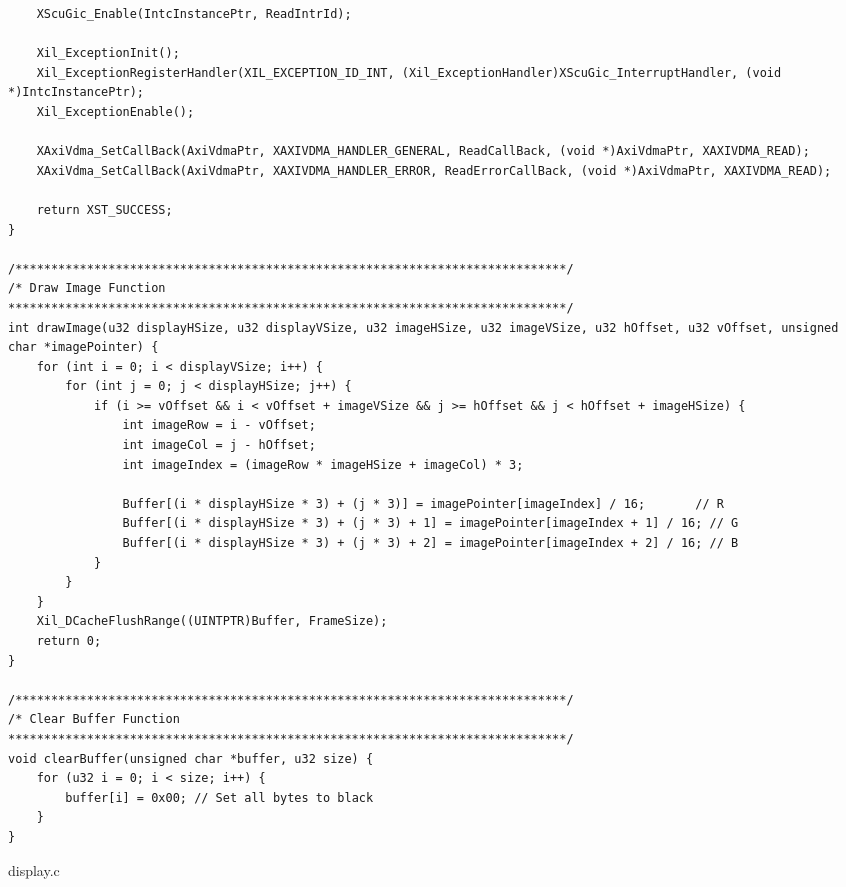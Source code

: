 \documentclass{article}
\newenvironment{longlisting}{\captionsetup{type=listing}}{}
\begin{document}
\begin{longlisting}
\begin{verbatim}
    XScuGic_Enable(IntcInstancePtr, ReadIntrId);

    Xil_ExceptionInit();
    Xil_ExceptionRegisterHandler(XIL_EXCEPTION_ID_INT, (Xil_ExceptionHandler)XScuGic_InterruptHandler, (void *)IntcInstancePtr);
    Xil_ExceptionEnable();

    XAxiVdma_SetCallBack(AxiVdmaPtr, XAXIVDMA_HANDLER_GENERAL, ReadCallBack, (void *)AxiVdmaPtr, XAXIVDMA_READ);
    XAxiVdma_SetCallBack(AxiVdmaPtr, XAXIVDMA_HANDLER_ERROR, ReadErrorCallBack, (void *)AxiVdmaPtr, XAXIVDMA_READ);

    return XST_SUCCESS;
}

/*****************************************************************************/
/* Draw Image Function
******************************************************************************/
int drawImage(u32 displayHSize, u32 displayVSize, u32 imageHSize, u32 imageVSize, u32 hOffset, u32 vOffset, unsigned char *imagePointer) {
    for (int i = 0; i < displayVSize; i++) {
        for (int j = 0; j < displayHSize; j++) {
            if (i >= vOffset && i < vOffset + imageVSize && j >= hOffset && j < hOffset + imageHSize) {
                int imageRow = i - vOffset;
                int imageCol = j - hOffset;
                int imageIndex = (imageRow * imageHSize + imageCol) * 3;

                Buffer[(i * displayHSize * 3) + (j * 3)] = imagePointer[imageIndex] / 16;       // R
                Buffer[(i * displayHSize * 3) + (j * 3) + 1] = imagePointer[imageIndex + 1] / 16; // G
                Buffer[(i * displayHSize * 3) + (j * 3) + 2] = imagePointer[imageIndex + 2] / 16; // B
            }
        }
    }
    Xil_DCacheFlushRange((UINTPTR)Buffer, FrameSize);
    return 0;
}

/*****************************************************************************/
/* Clear Buffer Function
******************************************************************************/
void clearBuffer(unsigned char *buffer, u32 size) {
    for (u32 i = 0; i < size; i++) {
        buffer[i] = 0x00; // Set all bytes to black
    }
}
    \end{verbatim}
\caption{display.c}
\label{code:display}
\end{longlisting}
\end{document}

